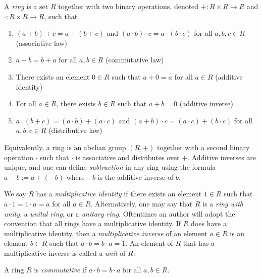 \documentclass{article}
\begin{document}
A \emph{ring} is a set $R$ together with two binary operations, denoted $+: R \times R \longrightarrow R$ and $\cdot: R \times R \longrightarrow R$, such that
\begin{enumerate}
\item $(a+b)+c = a+(b+c)$ and $(a \cdot b) \cdot c = a \cdot (b \cdot c)$ for all $a,b,c \in R$ (associative law)
\item $a+b = b+a$ for all $a,b \in R$ (commutative law)
\item There exists an element $0 \in R$ such that $a+0 = a$ for all $a \in R$ (additive identity)
\item For all $a \in R$, there exists $b \in R$ such that $a+b = 0$ (additive inverse)
\item $a\cdot(b+c) = (a \cdot b) + (a \cdot c)$ and $(a+b) \cdot c = (a \cdot c) + (b \cdot c)$ for all $a,b,c \in R$ (distributive law)
\end{enumerate}
Equivalently, a ring is an abelian group $(R,+)$ together with a second binary operation $\cdot$ such that $\cdot$ is associative and distributes over $+$. Additive inverses are unique, and one can define \emph{subtraction} in any ring using the formula $a-b := a + (-b)$ where $-b$ is the additive inverse of $b$.

We say $R$ has a \emph{multiplicative identity} if there exists an element $1 \in R$ such that $a \cdot 1 = 1 \cdot a = a$ for all $a \in R$. Alternatively, one may say that $R$ is a \emph{ring with unity}, a \emph{unital ring}, or a \emph{unitary ring}. Oftentimes an author will adopt the convention that all rings have a multiplicative identity. If $R$ does have a multiplicative identity, then a \emph{multiplicative inverse} of an element $a \in R$ is an element $b \in R$ such that $a \cdot b = b \cdot a = 1$. An element of $R$ that has a multiplicative inverse is called a \emph{unit} of $R$.

A ring $R$ is \emph{commutative} if $a \cdot b = b \cdot a$ for all $a,b \in R$.
\end{document}
